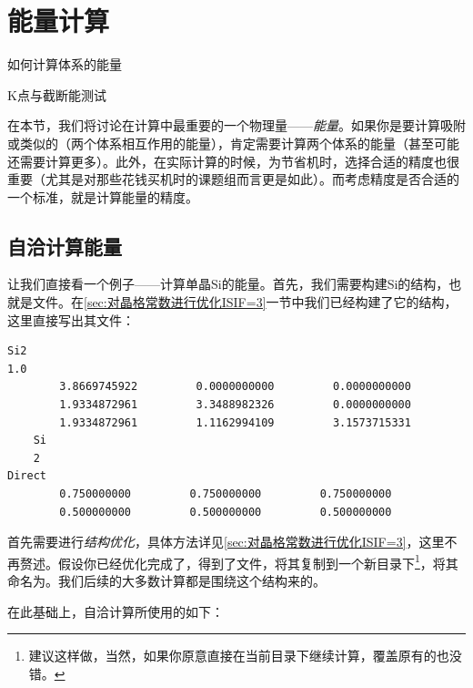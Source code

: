 \section{能量计算}\label{sec:能量计算}

\begin{Abstract}
    \item 如何计算体系的能量
    \item K点与截断能测试

\end{Abstract}

在本节，我们将讨论在计算中最重要的一个物理量——\emph{能量}。如果你是要计算吸附或类似的（两个体系相互作用的能量），肯定需要计算两个体系的能量（甚至可能还需要计算更多）。此外，在实际计算的时候，为节省机时，选择合适的精度也很重要（尤其是对那些花钱买机时的课题组而言更是如此）。而考虑精度是否合适的一个标准，就是计算能量的精度。


\subsection{自洽计算能量}\label{subsec:能量计算-自洽计算能量}

让我们直接看一个例子——计算单晶Si的能量。首先，我们需要构建Si的结构，也就是文件。在\ref{sec:对晶格常数进行优化ISIF=3}一节中我们已经构建了它的结构，这里直接写出其文件：

\begin{lstlisting}[caption=POSCAR]
Si2
1.0
        3.8669745922         0.0000000000         0.0000000000
        1.9334872961         3.3488982326         0.0000000000
        1.9334872961         1.1162994109         3.1573715331
    Si
    2
Direct
        0.750000000         0.750000000         0.750000000
        0.500000000         0.500000000         0.500000000
\end{lstlisting}

首先需要进行\emph{结构优化}，具体方法详见\ref{sec:对晶格常数进行优化ISIF=3}，这里不再赘述。假设你已经优化完成了，得到了文件，将其复制到一个新目录下\footnote{建议这样做，当然，如果你原意直接在当前目录下继续计算，覆盖原有的也没错。}，将其命名为。我们后续的大多数计算都是围绕这个结构来的。

在此基础上，自洽计算所使用的如下：

